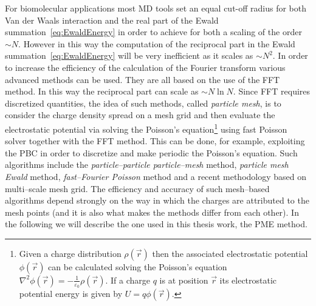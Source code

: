 For biomolecular applications most \ac{MD} tools set an equal cut-off radius for both Van der Waals interaction
and the real part of the Ewald summation~\eqref{eq:EwaldEnergy} in order to achieve for both a scaling of the
order $\sim N$. However in this way the computation of the reciprocal part in the Ewald
summation~\eqref{eq:EwaldEnergy} will be very inefficient as it scales as $\sim N^2$. In order to increase the
efficiency of the calculation of the Fourier transform various advanced methods can be used. They are all based
on the use of the \ac{FFT} method. In this way the reciprocal part can scale as $\sim N\ln N$. Since \ac{FFT}
requires discretized quantities, the idea of such methods, called \textit{particle mesh}, is to consider the
charge density spread on a mesh grid and then evaluate the electrostatic potential via solving the Poisson's
equation\footnote{Given a charge distribution $\rho(\vec r)$ then the associated electrostatic potential
$\phi(\vec r)$ can be calculated solving the Poisson's equation 
$\displaystyle \nabla^2\phi(\vec r) = -\frac{1}{\varepsilon_0} \rho(\vec r)$. If a charge $q$ is at position 
$\vec r$ its electrostatic potential energy is given by $U = q\phi(\vec r)$.}
using fast Poisson solver together with the \ac{FFT} method. This can be done, for example, exploiting the
\ac{PBC} in order to discretize and make periodic the Poisson's equation.
Such algorithms include the \textit{particle--particle particle--mesh} method, \textit{particle mesh Ewald}
method, \textit{fast--Fourier Poisson} method and a recent methodology based on multi--scale mesh grid. The
efficiency and accuracy of such mesh--based algorithms depend strongly on the way in which the charges are
attributed to the mesh points (and it is also what makes the methods differ from each other). In the following we 
will describe the one used in this thesis work, the \acf{PME} method.

